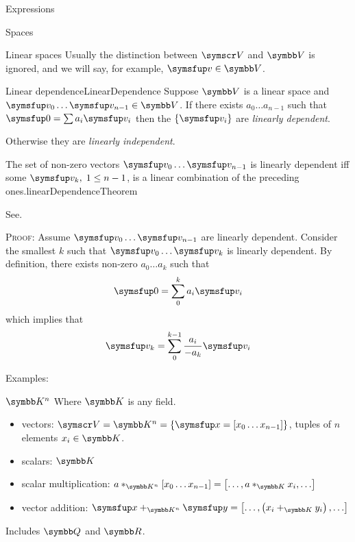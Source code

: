\documentclass[12pt]{PalisadesLakesArticle}
\begin{document}
\begin{plSection}{Expressions}
\begin{plSection}{Spaces}
\begin{plSection}{Linear spaces}
Usually the distinction between $\Set{V}$ and $\Space{V}$ 
is ignored, and we will say, for example, 
$\Vector{v} \in \Space{V}$.

\begin{plDefinition}{Linear dependence}{LinearDependence}
Suppose $\Space{V}$ is a linear space and
$\Vector{v}_0 \ldots  \Vector{v}_{n-1} \in \Space{V}$.
If there exists $a_0 \ldots  a_{n-1}$ such that
$\Vector{0} = \sum a_i \Vector{v}_i$ then the $\left\{ \Vector{v}_i \right\}$
are \textit{linearly dependent}.

Otherwise they are \textit{linearly independent}.
\end{plDefinition}

\begin{plTheorem}{The set of non-zero vectors
 $\Vector{v}_0 \ldots \Vector{v}_{n-1}$
is linearly dependent iff some $\Vector{v}_k, \; 1 \leq n-1$, 
is a linear combination of the preceding 
ones.}{linearDependenceTheorem}

See.

\textsc{Proof:}
Assume  $\Vector{v}_0 \ldots \Vector{v}_{n-1}$ are linearly dependent.
Consider the smallest $k$ such that 
$\Vector{v}_0 \ldots \Vector{v}_{k}$ is linearly dependent.
By definition,
there exists non-zero $a_0 \ldots a_{k}$ such that
\begin{equation}
\Vector{0} = \sum_0^k a_i \Vector{v}_i
\end{equation}
which implies that
\begin{equation}
\Vector{v}_k = \sum_0^{k-1} \frac{a_i}{- a_k} \Vector{v}_i
\end{equation}
\end{plTheorem}

Examples:

\begin{plExample}{$\Space{K}^n$}{}
Where $\Space{K}$ is any field.
\begin{itemize}
  \item vectors:
  $\Set{V} = \Space{K}^n = \left\{ \Vector{x}
  = \left[ x_0 \ldots  x_{n-1} \right] \right\}$,
  tuples of $n$ elements $x_i \in \Space{K}$.
  \item scalars: $\Space{K}$
  \item scalar multiplication:
  $ a *_{\Space{K}^n} \left[ x_0 \ldots  x_{n-1} \right] =
  \left[ \ldots , a *_{\Space{K}} x_{i} , \ldots \right]$
  \item vector addition:
  $\Vector{x} +_{\Space{K}^n} \Vector{y}
  = \left[ \ldots , \left( x_i +_{\Space{K}} y_i \right) ,\ldots \right]$
\end{itemize}
Includes $\Space{Q}$ and $\Space{R}$.
\end{plExample}


\end{plSection}
\end{plSection}
\end{plSection}
\end{document}
